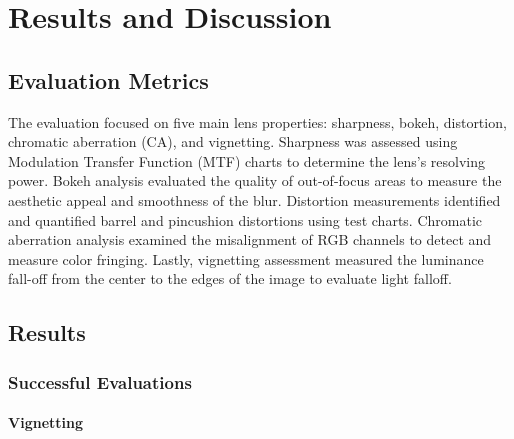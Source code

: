 
\chapter{Results and Discussion}
\label{chap:results}

\section{Evaluation Metrics}
The evaluation focused on five main lens properties: sharpness, bokeh, distortion, chromatic aberration (CA), and vignetting. Sharpness was assessed using Modulation Transfer Function (MTF) charts to determine the lens's resolving power. Bokeh analysis evaluated the quality of out-of-focus areas to measure the aesthetic appeal and smoothness of the blur. Distortion measurements identified and quantified barrel and pincushion distortions using test charts. Chromatic aberration analysis examined the misalignment of RGB channels to detect and measure color fringing. Lastly, vignetting assessment measured the luminance fall-off from the center to the edges of the image to evaluate light falloff.

\section{Results}
\subsection{Successful Evaluations}

\subsubsection{Vignetting}
\begin{table}[H]
    \centering
    \caption{Vignetting Assessment Results}
    \label{tab:vignetting_results}
\end{table}

